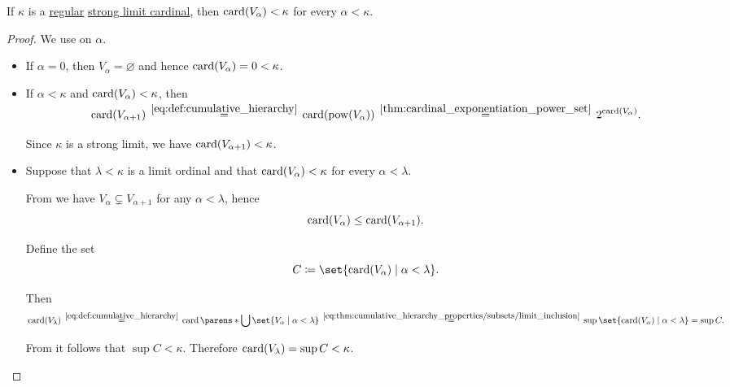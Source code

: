\begin{proposition}\label{thm:strongl_regular_cardinal_stages}
  If \( \kappa \) is a \hyperref[def:regular_cardinal]{regular} \hyperref[def:successor_and_limit_cardinal/strong_limit]{strong limit cardinal}, then \( \operatorname{card}(V_\alpha) < \kappa \) for every \( \alpha < \kappa \).
\end{proposition}
\begin{proof}
  We use  on \( \alpha \).
  \begin{itemize}
    \item If \( \alpha = 0 \), then \( V_\alpha = \varnothing \) and hence \( \operatorname{card}(V_\alpha) = 0 < \kappa \).
    \item If \( \alpha < \kappa \) and \( \operatorname{card}(V_\alpha) < \kappa \), then
    \begin{equation*}
      \card(V_{\alpha + 1})
      \reloset {\eqref{eq:def:cumulative_hierarchy}} =
      \card(\pow(V_\alpha))
      \reloset {\ref{thm:cardinal_exponentiation_power_set}} =
      2^{\card(V_\alpha)}.
    \end{equation*}

    Since \( \kappa \) is a strong limit, we have \( \operatorname{card}(V_{\alpha + 1}) < \kappa \).

    \item Suppose that \( \lambda < \kappa \) is a limit ordinal and that \( \operatorname{card}(V_\alpha) < \kappa \) for every \( \alpha < \lambda \).

    From  we have \( V_\alpha \subsetneq V_{\alpha + 1} \) for any \( \alpha < \lambda \), hence
    \begin{equation}\label{eq:thm:cumulative_hierarchy_properties/subsets/limit_inclusion}
      \operatorname{card}(V_\alpha) \leq \operatorname{card}(V_{\alpha + 1}).
    \end{equation}

    Define the set
    \begin{equation*}
      C \coloneqq \set{ \card(V_\alpha) \given \alpha < \lambda }.
    \end{equation*}

    Then
    \begin{equation*}
      \card(V_\lambda)
      \reloset {\eqref{eq:def:cumulative_hierarchy}} =
      \card\parens*{ \bigcup \set{ V_\alpha \given \alpha < \lambda } }
      \reloset {\eqref{eq:thm:cumulative_hierarchy_properties/subsets/limit_inclusion}} =
      \sup\set{ \card(V_\alpha) \given \alpha < \lambda }
      =
      \sup C.
    \end{equation*}

    From  it follows that \( \sup C < \kappa \). Therefore \( \operatorname{card}(V_\lambda) = \sup C < \kappa \).
  \end{itemize}
\end{proof}


